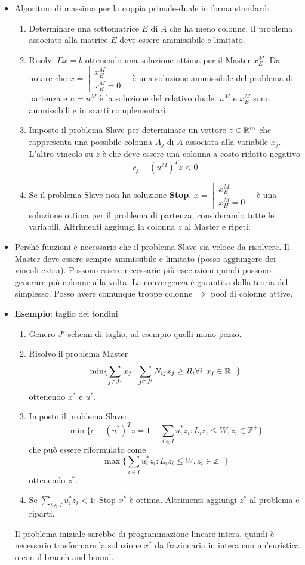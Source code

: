 \begin{itemize}
	\item Algoritmo di massima per la coppia primale-duale in forma standard:
	\begin{enumerate}
		\item Determinare una sottomatrice $E$ di $A$ che ha meno colonne. Il problema associato alla matrice $E$ deve essere ammissibile e limitato.
		\item Risolvi $Ex = b$ ottenendo una soluzione ottima per il Master $x_{E}^M$. Da notare che $x = \begin{bmatrix} x_{E}^M \\
		x_{H}^M = 0
		\end{bmatrix}$ è una soluzione ammissibile del problema di partenza e $u = u^M$ è la soluzione del relativo duale. $u^M$ e $x_{E}^M$ sono ammissibili e in scarti complementari.
		\item Imposto il problema Slave per determinare un vettore $z \in \mathbb{R}^m$ che rappresenta una possibile colonna $A_j$ di $A$ associata alla variabile $x_j$. L'altro vincolo su $z$ è che deve essere una colonna a costo ridotto negativo
		$$
		c_j - (u^M)^T z < 0
		$$
		\item Se il problema Slave non ha soluzione \textbf{Stop}. $x = \begin{bmatrix} x_{E}^M \\
		x_{H}^M = 0
		\end{bmatrix}$ è una soluzione ottima per il problema di partenza, considerando tutte le variabili. Altrimenti aggiungi la colonna $z$ al Master e ripeti.
	\end{enumerate}
	\item Perché funzioni è necessario che il problema Slave sia veloce da risolvere. Il Master deve essere sempre ammissibile e limitato (posso aggiungere dei vincoli extra). Possono essere necessarie più esecuzioni quindi possono generare più colonne alla volta. La convergenza è garantita dalla teoria del simplesso. Posso avere comunque troppe colonne $\Rightarrow$ pool di colonne attive.
	\item \textbf{Esempio}: taglio dei tondini
	\begin{enumerate}
		\item Genero $J'$ schemi di taglio, ad esempio quelli mono pezzo.
		\item Risolvo il problema Master
		$$
		\min \{ \sum_{j \in J'} x_j : \sum_{j \in J'} N_{ij}x_j \geq R_i \forall i, x_j \in \mathbb{R}^+ \}
		$$
		ottenendo $x^*$ e $u^*$.
		\item Imposto il problema Slave:
		$$
		\min \{\overline{c} - (u^*)^Tz = 1 - \sum_{i \in I} u_{i}^*z_i : L_iz_i \leq W, z_i \in \mathbb{Z}^+ \}
		$$
		che può essere riformulato come
		$$
		\max \{\sum_{i \in I} u_{i}^*z_i : L_iz_i \leq W, z_i \in \mathbb{Z}^+ \}
		$$
		ottenendo $z^*$.
		\item Se $\sum_{i \in I} u_{i}^*z_i < 1$: Stop $x^*$ è ottima. Altrimenti aggiungi $z^*$ al problema e riparti.
	\end{enumerate} 
	Il problema iniziale sarebbe di programmazione lineare intera, quindi è necessario trasformare la soluzione $x^*$ da frazionaria in intera con un'euristica o con il branch-and-bound.
\end{itemize}


